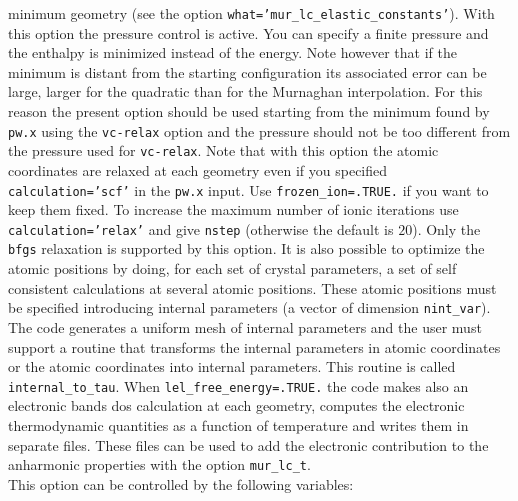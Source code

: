 \documentclass[12pt,a4paper,twoside]{report}
\begin{document}
minimum geometry (see the option \texttt{what='mur\_lc\_elastic\_constants'}). 
With this option the pressure control is active. You can specify a 
finite pressure and the enthalpy is minimized instead of the
energy. Note however that if the minimum is distant from the starting
configuration its associated error can be large, larger for the
quadratic than for the Murnaghan interpolation. For this
reason the present option should be used starting from the minimum found by
\texttt{pw.x} using the \texttt{vc-relax} option and the pressure 
should not be too different from the pressure used for \texttt{vc-relax}.
Note that with this option the atomic coordinates are relaxed at each
geometry even if you specified \texttt{calculation='scf'} in the 
\texttt{pw.x} input. Use \texttt{frozen\_ion=.TRUE.} if you want to keep
them fixed. To increase the maximum number of ionic iterations use
\texttt{calculation='relax'} and give \texttt{nstep} (otherwise the default 
is $20$). Only the \texttt{bfgs} relaxation is supported by this
option.
It is also possible to optimize the atomic positions by doing, for each
set of crystal parameters, a set of self consistent calculations at several
atomic positions. These atomic positions must be specified introducing
internal parameters (a vector of dimension \texttt{nint\_var}). The
code generates a uniform mesh of internal parameters and the user
must support a routine that transforms the internal parameters in
atomic coordinates or the atomic coordinates
into internal parameters. This routine is called \texttt{internal\_to\_tau}.
When \texttt{lel\_free\_energy=.TRUE.} the code makes also an electronic bands
dos calculation at each geometry, computes the electronic thermodynamic
quantities as a function of temperature and writes them in separate files.
These files can be used to add the electronic contribution to the
anharmonic properties with the option \texttt{mur\_lc\_t}.\\
This option can be controlled by the following variables:
\end{document}
